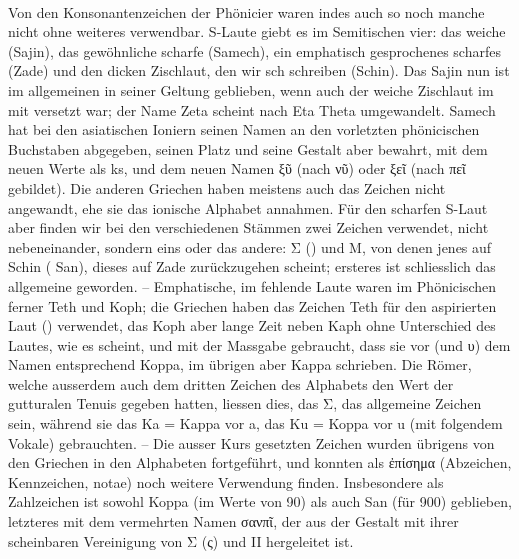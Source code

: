 \paragraph{\label{par:san}} Von den Konsonantenzeichen der Phönicier waren indes auch so noch manche nicht ohne weiteres verwendbar.
S-Laute giebt es im Semitischen vier: das weiche  (Sajin), das gewöhnliche scharfe (Samech), ein emphatisch gesprochenes scharfes (Zade) und den dicken Zischlaut, den wir sch schreiben (Schin).
Das Sajin nun ist im allgemeinen in seiner Geltung geblieben, wenn auch der
weiche Zischlaut im  mit  versetzt war; der Name Zeta scheint nach Eta Theta umgewandelt.
Samech hat bei den asiatischen Ioniern seinen Namen an den vorletzten phönicischen Buchstaben abgegeben, seinen Platz und seine Gestalt aber bewahrt, mit dem neuen Werte als ks, und dem neuen Namen ξῦ (nach νῦ) oder ξεῖ (nach πεῖ gebildet).
Die anderen Griechen haben meistens auch das Zeichen nicht angewandt, ehe sie das ionische Alphabet annahmen.
Für den scharfen S-Laut aber finden wir bei den verschiedenen Stämmen zwei
Zeichen verwendet, nicht nebeneinander, sondern eins oder das andere: Σ
() und Μ, von denen jenes auf Schin ( San), dieses auf Zade zurückzugehen scheint; ersteres ist schliesslich das allgemeine geworden.
-- Emphatische, im  fehlende Laute waren im Phönicischen
ferner Teth und Koph; die Griechen haben das Zeichen Teth für den aspirierten
Laut () verwendet, das Koph aber lange Zeit neben Kaph ohne
Unterschied des Lautes, wie es scheint, und mit der Massgabe gebraucht, dass sie
vor  (und  υ) dem Namen entsprechend Koppa, im übrigen aber Kappa
schrieben.
Die Römer, welche ausserdem auch dem dritten Zeichen des Alphabets den Wert der gutturalen Tenuis gegeben hatten, liessen dies, das Σ, das allgemeine Zeichen sein, während sie das Ka = Kappa vor a, das Ku = Koppa vor u (mit folgendem Vokale) gebrauchten. -- Die ausser Kurs gesetzten Zeichen wurden übrigens von den Griechen in den Alphabeten fortgeführt, und konnten als ἐπίσημα (Abzeichen, Kennzeichen, notae) noch weitere Verwendung finden.
Insbesondere als Zahlzeichen ist sowohl Koppa (im Werte von 90) als auch San
(für 900) geblieben, letzteres mit dem vermehrten Namen σανπῖ, der aus der
Gestalt  mit ihrer scheinbaren Vereinigung von Σ (ς) und II hergeleitet
ist.

